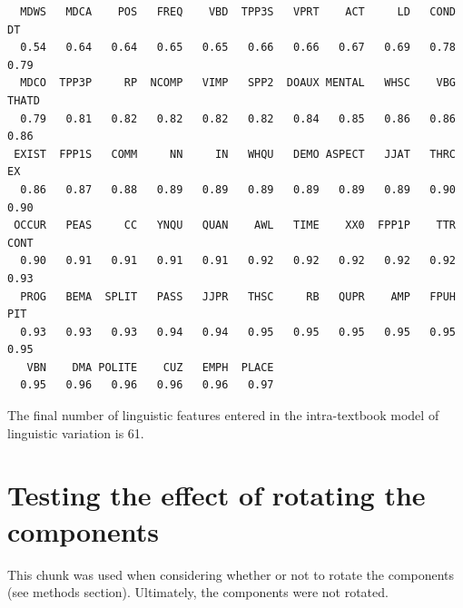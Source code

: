 \documentclass[
  letterpaper,
  DIV=11,
  numbers=noendperiod]{scrreprt}
\begin{document}
\begin{verbatim}
  MDWS   MDCA    POS   FREQ    VBD  TPP3S   VPRT    ACT     LD   COND     DT 
  0.54   0.64   0.64   0.65   0.65   0.66   0.66   0.67   0.69   0.78   0.79 
  MDCO  TPP3P     RP  NCOMP   VIMP   SPP2  DOAUX MENTAL   WHSC    VBG  THATD 
  0.79   0.81   0.82   0.82   0.82   0.82   0.84   0.85   0.86   0.86   0.86 
 EXIST  FPP1S   COMM     NN     IN   WHQU   DEMO ASPECT   JJAT   THRC     EX 
  0.86   0.87   0.88   0.89   0.89   0.89   0.89   0.89   0.89   0.90   0.90 
 OCCUR   PEAS     CC   YNQU   QUAN    AWL   TIME    XX0  FPP1P    TTR   CONT 
  0.90   0.91   0.91   0.91   0.91   0.92   0.92   0.92   0.92   0.92   0.93 
  PROG   BEMA  SPLIT   PASS   JJPR   THSC     RB   QUPR    AMP   FPUH    PIT 
  0.93   0.93   0.93   0.94   0.94   0.95   0.95   0.95   0.95   0.95   0.95 
   VBN    DMA POLITE    CUZ   EMPH  PLACE 
  0.95   0.96   0.96   0.96   0.96   0.97 
\end{verbatim}

The final number of linguistic features entered in the intra-textbook
model of linguistic variation is 61.

\section{Testing the effect of rotating the
components}\label{testing-the-effect-of-rotating-the-components}

This chunk was used when considering whether or not to rotate the
components (see methods section). Ultimately, the components were not
rotated.
\end{document}

